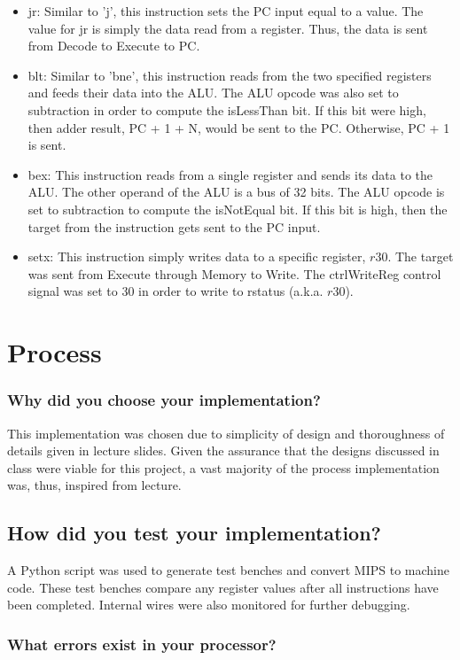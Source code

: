 \documentclass[a4paper,11pt]{article}
\begin{document}
\begin{itemize}
    \item jr: Similar to 'j', this instruction sets the PC input equal to a value. The value for jr is simply the data read from a register. Thus, the data is sent from Decode to Execute to PC.
    \item blt: Similar to 'bne', this instruction reads from the two specified registers and feeds their data into the ALU. The ALU opcode was also set to subtraction in order to compute the isLessThan bit. If this bit were high, then adder result, PC + 1 + N, would be sent to the PC. Otherwise, PC + 1 is sent.
    \item bex: This instruction reads from a single register and sends its data to the ALU. The other operand of the ALU is a bus of 32 bits. The ALU opcode is set to subtraction to compute the isNotEqual bit. If this bit is high, then the target from the instruction gets sent to the PC input.
    \item setx: This instruction simply writes data to a specific register, $r30$. The target was sent from Execute through Memory to Write. The ctrlWriteReg control signal was set to 30 in order to write to rstatus (a.k.a. $r30$).
    
\end{itemize}

\newpage

\section{Process}

\subsubsection*{Why did you choose your implementation?}
This implementation was chosen due to simplicity of design and thoroughness of details given in lecture slides. Given the assurance that the designs discussed in class were viable for this project, a vast majority of the process implementation was, thus, inspired from lecture.
\subsection*{How did you test your implementation?}
A Python script was used to generate test benches and convert MIPS to machine code. These test benches compare any register values after all instructions have been completed. Internal wires were also monitored for further debugging.

\subsubsection*{What errors exist in your processor?}
\end{document}
